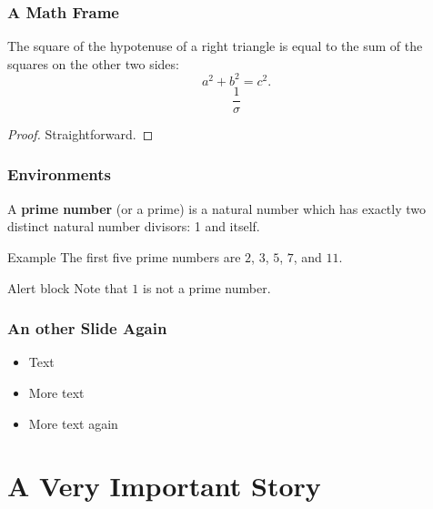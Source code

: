 
\begin{frame}
\frametitle{A Math Frame}
  \begin{theorem}[Pythagoras]
    The square of the hypotenuse of a \alert{right} triangle is equal to the sum of the squares on the other two sides:
    \[
    a^2 + b^2 = c^2.
    \]
    \[\frac{1}{\sigma}\]
  \end{theorem}
  \begin{proof}
    Straightforward.
  \end{proof}
\end{frame}


\begin{frame}
\frametitle{Environments}
  \begin{definition}
    A \textbf{prime number} (or a prime) is a natural number which has exactly two distinct natural number divisors: 1 and itself. 
  \end{definition}

  \begin{exampleblock}{Example}
    The first five prime numbers are $2$, $3$, $5$, $7$, and $11$.
  \end{exampleblock}

  \begin{alertblock}{Alert block}
    Note that $1$ is not a prime number.
  \end{alertblock}
\end{frame}


\begin{frame} 
\frametitle{An other Slide Again}
  \begin{itemize}
  \item Text
  \item More text
  \item More text again
  \end{itemize}
\end{frame}

\section{A Very Important Story}

